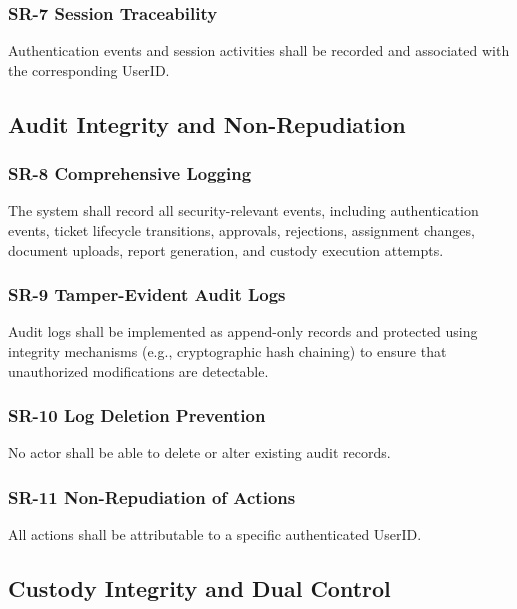 \documentclass[12pt,a4paper]{report}
\begin{document}
\subsubsection{SR-7 Session Traceability}

Authentication events and session activities shall be recorded and associated with the corresponding UserID.


\subsection{Audit Integrity and Non-Repudiation}

\subsubsection{SR-8 Comprehensive Logging}

The system shall record all security-relevant events, including authentication events, ticket lifecycle transitions, approvals, rejections, assignment changes, document uploads, report generation, and custody execution attempts.

\subsubsection{SR-9 Tamper-Evident Audit Logs}

Audit logs shall be implemented as append-only records and protected using integrity mechanisms (e.g., cryptographic hash chaining) to ensure that unauthorized modifications are detectable.

\subsubsection{SR-10 Log Deletion Prevention}

No actor shall be able to delete or alter existing audit records.

\subsubsection{SR-11 Non-Repudiation of Actions}

All actions shall be attributable to a specific authenticated UserID.

\subsection{Custody Integrity and Dual Control}
\end{document}
